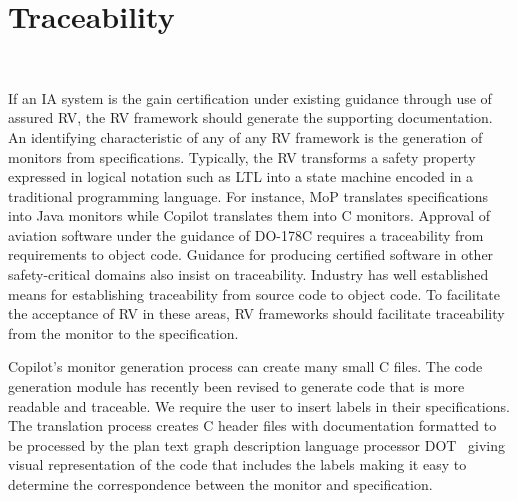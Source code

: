 \section{Traceability}~\label{sec:trace}

\noindent{}


If an IA system is the gain certification under existing guidance
through use of assured RV, the RV framework should generate the
supporting documentation.  An identifying characteristic of any of any
RV framework is the generation of monitors from
specifications. Typically, the RV transforms a safety property
expressed in logical notation such as LTL into a state machine encoded
in a traditional programming language. For instance, MoP translates
specifications into Java monitors while Copilot translates them into C
monitors. Approval of aviation software under the guidance of DO-178C
requires a traceability from requirements to object code. Guidance for
producing certified software in other safety-critical domains also
insist on traceability.  Industry has well established means for
establishing traceability from source code to object code.  To
facilitate the acceptance of RV in these areas, RV frameworks should
facilitate traceability from the monitor to the specification.  


Copilot's monitor generation process can create many small C
files. The code generation module has recently been revised to
generate code that is more readable and traceable.  We require the
user to insert labels in their specifications. The translation process
creates C header files with documentation formatted to be processed by
the plan text graph description language processor  DOT~\cite{ZZZZ}
giving  visual representation of the code  that includes the labels
making it easy to determine the correspondence between the monitor and
specification. 



